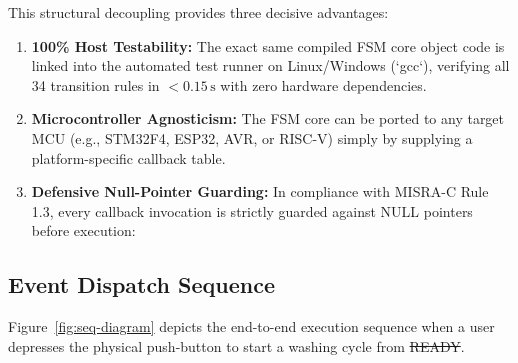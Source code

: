 \noindent This structural decoupling provides three decisive advantages:
\begin{enumerate}
  \item \textbf{100\% Host Testability:} The exact same compiled FSM core object code
        is linked into the automated test runner on Linux/Windows (`gcc`), verifying all 34 transition rules
        in $<0.15\,\text{s}$ with zero hardware dependencies.
  \item \textbf{Microcontroller Agnosticism:} The FSM core can be ported to any target MCU (e.g., STM32F4,
        ESP32, AVR, or RISC-V) simply by supplying a platform-specific callback table.
  \item \textbf{Defensive Null-Pointer Guarding:} In compliance with MISRA-C Rule 1.3, every callback invocation
        is strictly guarded against NULL pointers before execution:
        \begin{center}
          \small{}
        \end{center}
\end{enumerate}

\subsection{Event Dispatch Sequence}

Figure~\ref{fig:seq-diagram} depicts the end-to-end execution sequence when a user depresses the physical
 push-button to start a washing cycle from \st{READY}.

